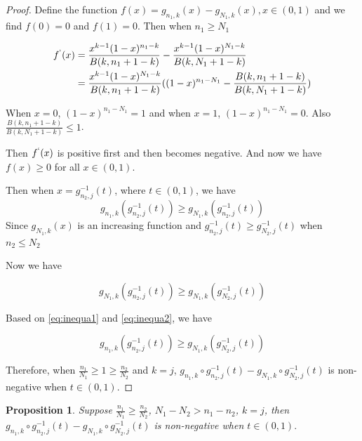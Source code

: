 \documentclass[12pt]{article}
\newtheorem{prop}[theorem]{Proposition}
\begin{document}
\begin{proof}
	Define the function $f(x) = g_{n_1, k}(x) - g_{N_1, k}(x), x \in (0,1)$ and we find $f(0) = 0$ and $f(1) = 0$. Then when $n_1 \geq N_1$
	
	\begin{align*}
		f^`(x) &= \frac{x^{k-1}(1-x)^{n_1 - k}}{B(k, n_1+1-k)} - \frac{x^{k-1}(1-x)^{N_1 - k}}{B(k, N_1+1-k)} \\
		&= \frac{x^{k-1}(1-x)^{N_1 - k}}{B(k, n_1+1-k)}((1-x)^{n_1 - N_1} - \frac{B(k, n_1+1-k)}{B(k, N_1+1-k)})
	\end{align*}

When $x = 0$, $(1-x)^{n_1 - N_1} = 1$ and when $x = 1$, $(1-x)^{n_1 - N_1} = 0$. Also $\frac{B(k, n_1+1-k)}{B(k, N_1+1-k)} \leq 1$. 

Then $f^`(x)$ is positive first and then becomes negative. And now we have $f(x) \geq 0$ for all $x \in (0,1)$.

Then when $x = g_{n_2, j}^{-1}(t)$, where $t \in (0,1)$, we have
\begin{equation} \label{eq:inequa1}
	g_{n_1, k}(g_{n_2, j}^{-1}(t)) \geq g_{N_1, k}(g_{n_2, j}^{-1}(t))
\end{equation}
Since $g_{N_1, k}(x)$ is an increasing function and $g_{n_2, j}^{-1}(t) \geq g_{N_2, j}^{-1}(t)$ when $n_2 \leq N_2$

Now we have 

\begin{equation} \label{eq:inequa2}
	g_{N_1, k}(g_{n_2, j}^{-1}(t)) \geq g_{N_1, k}(g_{N_2, j}^{-1}(t))
\end{equation}

Based on \ref{eq:inequa1} and \ref{eq:inequa2}, we have 

\begin{equation} \label{eq:inequa2}
	g_{n_1, k}(g_{n_2, j}^{-1}(t)) \geq g_{N_1, k}(g_{N_2, j}^{-1}(t))
\end{equation}

Therefore, when $\frac{n_1}{N_1} \geq 1 \geq \frac{n_2}{N_2}$ and $k = j$, $g_{n_1, k} \circ g_{n_2, j}^{-1}(t) - g_{N_1, k} \circ g_{N_2, j}^{-1}(t)$ is non-negative when $t \in (0,1).$

\end{proof}

\begin{prop} \label{prop:condition}
	Suppose $\frac{n_1}{N_1} \geq \frac{n_2}{N_2}$, $N_1 - N_2 > n_1 - n_2$, $k = j$, then $g_{n_1, k} \circ g_{n_2, j}^{-1}(t) - g_{N_1, k} \circ g_{N_2, j}^{-1}(t)$ is non-negative when $t \in (0,1).$
\end{prop}
\end{document}

